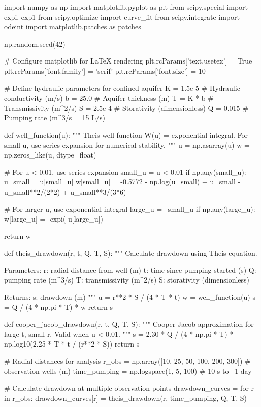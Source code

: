 \documentclass[a4paper, 11pt]{article}
\begin{document}
\begin{pycode}
import numpy as np
import matplotlib.pyplot as plt
from scipy.special import expi, exp1
from scipy.optimize import curve_fit
from scipy.integrate import odeint
import matplotlib.patches as patches

np.random.seed(42)

# Configure matplotlib for LaTeX rendering
plt.rcParams['text.usetex'] = True
plt.rcParams['font.family'] = 'serif'
plt.rcParams['font.size'] = 10

# Define hydraulic parameters for confined aquifer
K = 1.5e-5  # Hydraulic conductivity (m/s)
b = 25.0    # Aquifer thickness (m)
T = K * b   # Transmissivity (m^2/s)
S = 2.5e-4  # Storativity (dimensionless)
Q = 0.015   # Pumping rate (m^3/s = 15 L/s)

def well_function(u):
    """
    Theis well function W(u) = exponential integral.
    For small u, use series expansion for numerical stability.
    """
    u = np.asarray(u)
    w = np.zeros_like(u, dtype=float)

    # For u < 0.01, use series expansion
    small_u = u < 0.01
    if np.any(small_u):
        u_small = u[small_u]
        w[small_u] = -0.5772 - np.log(u_small) + u_small - u_small**2/(2*2) + u_small**3/(3*6)

    # For larger u, use exponential integral
    large_u = ~small_u
    if np.any(large_u):
        w[large_u] = -expi(-u[large_u])

    return w

def theis_drawdown(r, t, Q, T, S):
    """
    Calculate drawdown using Theis equation.

    Parameters:
    r: radial distance from well (m)
    t: time since pumping started (s)
    Q: pumping rate (m^3/s)
    T: transmissivity (m^2/s)
    S: storativity (dimensionless)

    Returns:
    s: drawdown (m)
    """
    u = r**2 * S / (4 * T * t)
    w = well_function(u)
    s = Q / (4 * np.pi * T) * w
    return s

def cooper_jacob_drawdown(r, t, Q, T, S):
    """
    Cooper-Jacob approximation for large t, small r.
    Valid when u < 0.01.
    """
    s = 2.30 * Q / (4 * np.pi * T) * np.log10(2.25 * T * t / (r**2 * S))
    return s

# Radial distances for analysis
r_obs = np.array([10, 25, 50, 100, 200, 300])  # observation wells (m)
time_pumping = np.logspace(1, 5, 100)  # 10 s to ~1 day

# Calculate drawdown at multiple observation points
drawdown_curves = {}
for r in r_obs:
    drawdown_curves[r] = theis_drawdown(r, time_pumping, Q, T, S)
\end{pycode}
\end{document}
